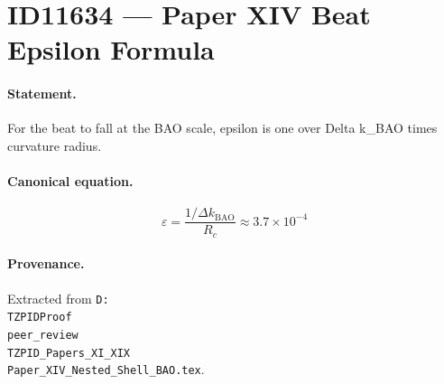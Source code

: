 \section*{ID11634 --- Paper XIV Beat Epsilon Formula}

\paragraph{Statement.}
For the beat to fall at the BAO scale, epsilon is one over Delta k_BAO times curvature radius.

\paragraph{Canonical equation.}
\[
\varepsilon=\frac{1/\Delta k_{\mathrm{BAO}}}{R_c}\approx3.7\times10^{-4}
\]

\paragraph{Provenance.}
Extracted from \texttt{D:\\TZPIDProof\\peer\_review\\TZPID\_Papers\_XI\_XIX\\Paper\_XIV\_Nested\_Shell\_BAO.tex}.
